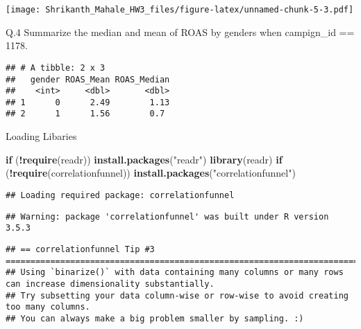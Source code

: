 \documentclass[]{article}
\newenvironment{Shaded}{\begin{snugshade}}{\end{snugshade}}
\newcommand{\KeywordTok}[1]{\textcolor[rgb]{0.13,0.29,0.53}{\textbf{#1}}}
\newcommand{\DataTypeTok}[1]{\textcolor[rgb]{0.13,0.29,0.53}{#1}}
\newcommand{\DecValTok}[1]{\textcolor[rgb]{0.00,0.00,0.81}{#1}}
\newcommand{\StringTok}[1]{\textcolor[rgb]{0.31,0.60,0.02}{#1}}
\newcommand{\ControlFlowTok}[1]{\textcolor[rgb]{0.13,0.29,0.53}{\textbf{#1}}}
\newcommand{\OperatorTok}[1]{\textcolor[rgb]{0.81,0.36,0.00}{\textbf{#1}}}
\newcommand{\NormalTok}[1]{#1}
\begin{document}
\texttt{[image: Shrikanth\_Mahale\_HW3\_files/figure-latex/unnamed-chunk-5-3.pdf]}

Q.4 Summarize the median and mean of ROAS by genders when campign\_id ==
1178.

\begin{Shaded}
\end{Shaded}

\begin{verbatim}
## # A tibble: 2 x 3
##   gender ROAS_Mean ROAS_Median
##    <int>     <dbl>       <dbl>
## 1      0      2.49        1.13
## 2      1      1.56        0.7
\end{verbatim}

Loading Libaries

\begin{Shaded}
\begin{Highlighting}[]
\ControlFlowTok{if}\NormalTok{ (}\OperatorTok{!}\KeywordTok{require}\NormalTok{(readr)) }\KeywordTok{install.packages}\NormalTok{(}\StringTok{"readr"}\NormalTok{)}
\KeywordTok{library}\NormalTok{(readr)}
\ControlFlowTok{if}\NormalTok{ (}\OperatorTok{!}\KeywordTok{require}\NormalTok{(correlationfunnel)) }\KeywordTok{install.packages}\NormalTok{(}\StringTok{"correlationfunnel"}\NormalTok{)}
\end{Highlighting}
\end{Shaded}

\begin{verbatim}
## Loading required package: correlationfunnel
\end{verbatim}

\begin{verbatim}
## Warning: package 'correlationfunnel' was built under R version 3.5.3
\end{verbatim}

\begin{verbatim}
## == correlationfunnel Tip #3 ======================================================================================================
## Using `binarize()` with data containing many columns or many rows can increase dimensionality substantially.
## Try subsetting your data column-wise or row-wise to avoid creating too many columns.
## You can always make a big problem smaller by sampling. :)
\end{verbatim}
\end{document}
